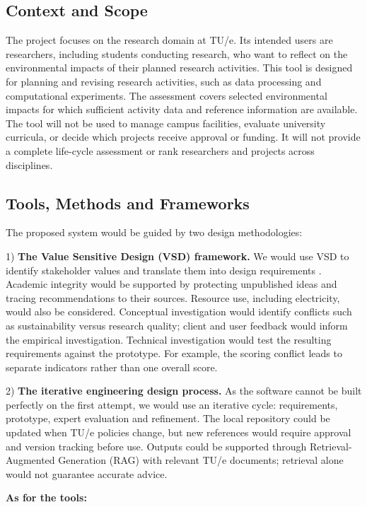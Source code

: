 \documentclass[11pt,a4paper]{article}
\begin{document}
\subsection{Context and Scope}

The project focuses on the research domain at TU/e. Its intended users are researchers, including students conducting research, who want to reflect on the environmental impacts of their planned research activities. This tool is designed for planning and revising research activities, such as data processing and computational experiments. The assessment covers selected environmental impacts for which sufficient activity data and reference information are available.
The tool will not be used to manage campus facilities, evaluate university curricula, or decide which projects receive approval or funding. It will not provide a complete life-cycle assessment or rank researchers and projects across disciplines.

\subsection{Tools, Methods and Frameworks}
The proposed system would be guided by two design methodologies:

1) \textbf{The Value Sensitive Design (VSD) framework.} We would use VSD to identify stakeholder values and translate them into design requirements \citep{friedman2019shaping,vsdlab}. Academic integrity would be supported by protecting unpublished ideas and tracing recommendations to their sources. Resource use, including electricity, would also be considered. Conceptual investigation would identify conflicts such as sustainability versus research quality; client and user feedback would inform the empirical investigation. Technical investigation would test the resulting requirements against the prototype. For example, the scoring conflict leads to separate indicators rather than one overall score.

2) \textbf{The iterative engineering design process.} As the software cannot be built perfectly on the first attempt, we would use an iterative cycle: requirements, prototype, expert evaluation and refinement. The local repository could be updated when TU/e policies change, but new references would require approval and version tracking before use. Outputs could be supported through Retrieval-Augmented Generation (RAG) with relevant TU/e documents; retrieval alone would not guarantee accurate advice.

\textbf{As for the tools:}
\end{document}
